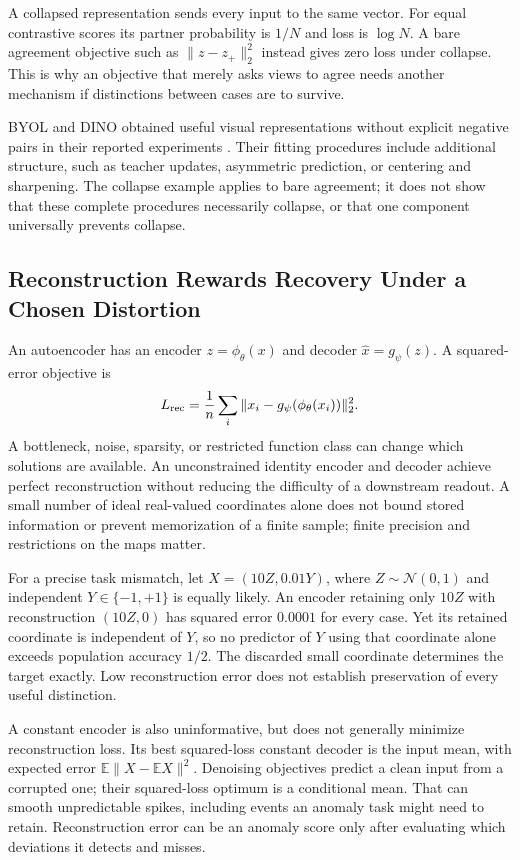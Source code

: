 A collapsed representation sends every input to the same vector. For equal contrastive scores its partner probability is $1/N$ and loss is $\log N$. A bare agreement objective such as $\|z-z_+\|_2^2$ instead gives zero loss under collapse. This is why an objective that merely asks views to agree needs another mechanism if distinctions between cases are to survive.

BYOL and DINO obtained useful visual representations without explicit negative pairs in their reported experiments \citep{grill2020byol,caron2021dino}. Their fitting procedures include additional structure, such as teacher updates, asymmetric prediction, or centering and sharpening. The collapse example applies to bare agreement; it does not show that these complete procedures necessarily collapse, or that one component universally prevents collapse.

\subsection{Reconstruction Rewards Recovery Under a Chosen Distortion}

An autoencoder has an encoder $z=\phi_\theta(x)$ and decoder $\hat x=g_\psi(z)$. A squared-error objective is
\[
L_{\rm rec}=\frac1n\sum_i\|x_i-g_\psi(\phi_\theta(x_i))\|_2^2.
\]
A bottleneck, noise, sparsity, or restricted function class can change which solutions are available. An unconstrained identity encoder and decoder achieve perfect reconstruction without reducing the difficulty of a downstream readout. A small number of ideal real-valued coordinates alone does not bound stored information or prevent memorization of a finite sample; finite precision and restrictions on the maps matter.

For a precise task mismatch, let $X=(10Z,0.01Y)$, where $Z\sim\mathcal N(0,1)$ and independent $Y\in\{-1,+1\}$ is equally likely. An encoder retaining only $10Z$ with reconstruction $(10Z,0)$ has squared error $0.0001$ for every case. Yet its retained coordinate is independent of $Y$, so no predictor of $Y$ using that coordinate alone exceeds population accuracy $1/2$. The discarded small coordinate determines the target exactly. Low reconstruction error does not establish preservation of every useful distinction.

A constant encoder is also uninformative, but does not generally minimize reconstruction loss. Its best squared-loss constant decoder is the input mean, with expected error $\mathbb E\|X-\mathbb E X\|^2$. Denoising objectives predict a clean input from a corrupted one; their squared-loss optimum is a conditional mean. That can smooth unpredictable spikes, including events an anomaly task might need to retain. Reconstruction error can be an anomaly score only after evaluating which deviations it detects and misses.


